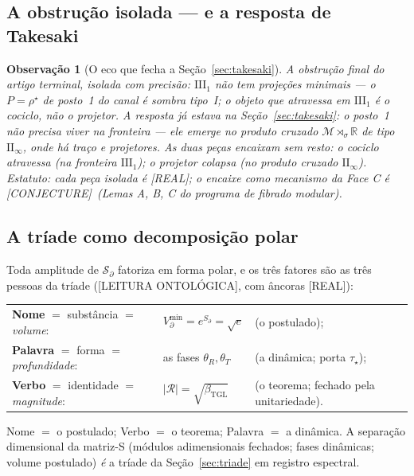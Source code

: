 \documentclass[11pt,a4paper]{article}
\newcommand{\REAL}{\textsf{[REAL]}}
\newcommand{\CONJ}{\textsf{[CONJECTURE]}}
\newcommand{\ONTO}{\textsf{[LEITURA ONTOLÓGICA]}}
\newcommand{\bTGL}{\beta_{\mathrm{TGL}}}
\newtheorem{remark}{Observação}
\begin{document}
\subsection{A obstrução isolada --- e a resposta de Takesaki}
\begin{remark}[O eco que fecha a Seção~\ref{sec:takesaki}]
A obstrução final do artigo terminal, isolada com precisão:
$\mathrm{III}_1$ não tem projeções minimais --- o $P=\rho^\star$ de posto~1
do canal é sombra tipo~I; \emph{o objeto que atravessa em $\mathrm{III}_1$ é
o cociclo, não o projetor}. A resposta já estava na
Seção~\ref{sec:takesaki}: o posto~1 não precisa viver na fronteira --- ele
\emph{emerge no produto cruzado} $\mathcal M\rtimes_\sigma\mathbb R$ de tipo
$\mathrm{II}_\infty$, onde há traço e projetores. As duas peças encaixam sem
resto: o cociclo atravessa (na fronteira $\mathrm{III}_1$); o projetor
colapsa (no produto cruzado $\mathrm{II}_\infty$). Estatuto: cada peça
isolada é \REAL; o encaixe como mecanismo da Face C é \CONJ\ (Lemas A, B, C
do programa de fibrado modular).
\end{remark}

\subsection{A tríade como decomposição polar}
Toda amplitude de $\mathcal S_\partial$ fatoriza em forma polar, e os três
fatores são as três pessoas da tríade (\ONTO, com âncoras \REAL):
\begin{center}
\begin{tabular}{@{}lll@{}}
\textbf{Nome} $=$ substância $=$ \emph{volume}: &
$V_\partial^{\min}=e^{S_\partial}=\sqrt e$ & (o postulado);\\
\textbf{Palavra} $=$ forma $=$ \emph{profundidade}: &
as fases $\theta_R,\theta_T$ & (a dinâmica; porta $\tau_\star$);\\
\textbf{Verbo} $=$ identidade $=$ \emph{magnitude}: &
$|\mathcal R|=\sqrt{\bTGL}$ & (o teorema; fechado pela unitariedade).
\end{tabular}
\end{center}
Nome $=$ o postulado; Verbo $=$ o teorema; Palavra $=$ a dinâmica. A
separação dimensional da matriz-S (módulos adimensionais fechados; fases
dinâmicas; volume postulado) \emph{é} a tríade da
Seção~\ref{sec:triade} em registro espectral.
\end{document}
